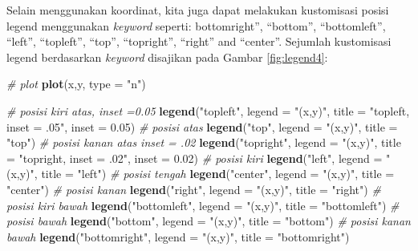 \documentclass[
]{book}
\newenvironment{Shaded}{\begin{snugshade}}{\end{snugshade}}
\newcommand{\AttributeTok}[1]{\textcolor[rgb]{0.13,0.29,0.53}{#1}}
\newcommand{\CommentTok}[1]{\textcolor[rgb]{0.56,0.35,0.01}{\textit{#1}}}
\newcommand{\FloatTok}[1]{\textcolor[rgb]{0.00,0.00,0.81}{#1}}
\newcommand{\FunctionTok}[1]{\textcolor[rgb]{0.13,0.29,0.53}{\textbf{#1}}}
\newcommand{\NormalTok}[1]{#1}
\newcommand{\StringTok}[1]{\textcolor[rgb]{0.31,0.60,0.02}{#1}}
\theoremstyle{definition}
\theoremstyle{definition}
\theoremstyle{definition}
\theoremstyle{definition}
\theoremstyle{remark}
\begin{document}
Selain menggunakan koordinat, kita juga dapat melakukan kustomisasi posisi legend menggunakan \emph{keyword} seperti: bottomright'', ``bottom'', ``bottomleft'', ``left'', ``topleft'', ``top'', ``topright'', ``right'' and ``center''. Sejumlah kustomisasi legend berdasarkan \emph{keyword} disajikan pada Gambar \ref{fig:legend4}:

\begin{Shaded}
\begin{Highlighting}[]
\CommentTok{\# plot}
\FunctionTok{plot}\NormalTok{(x,y, }\AttributeTok{type =} \StringTok{"n"}\NormalTok{)}

\CommentTok{\# posisi kiri atas, inset =0.05}
\FunctionTok{legend}\NormalTok{(}\StringTok{"topleft"}\NormalTok{,}
  \AttributeTok{legend =} \StringTok{"(x,y)"}\NormalTok{,}
  \AttributeTok{title =} \StringTok{"topleft, inset = .05"}\NormalTok{,}
  \AttributeTok{inset =} \FloatTok{0.05}\NormalTok{)}
\CommentTok{\# posisi atas}
\FunctionTok{legend}\NormalTok{(}\StringTok{"top"}\NormalTok{,}
       \AttributeTok{legend =} \StringTok{"(x,y)"}\NormalTok{,}
       \AttributeTok{title =} \StringTok{"top"}\NormalTok{)}
\CommentTok{\# posisi kanan atas inset = .02}
\FunctionTok{legend}\NormalTok{(}\StringTok{"topright"}\NormalTok{,}
       \AttributeTok{legend =} \StringTok{"(x,y)"}\NormalTok{,}
       \AttributeTok{title =} \StringTok{"topright, inset = .02"}\NormalTok{,}
       \AttributeTok{inset =} \FloatTok{0.02}\NormalTok{)}
\CommentTok{\# posisi kiri}
\FunctionTok{legend}\NormalTok{(}\StringTok{"left"}\NormalTok{,}
       \AttributeTok{legend =} \StringTok{"(x,y)"}\NormalTok{,}
       \AttributeTok{title =} \StringTok{"left"}\NormalTok{)}
\CommentTok{\# posisi tengah}
\FunctionTok{legend}\NormalTok{(}\StringTok{"center"}\NormalTok{,}
       \AttributeTok{legend =} \StringTok{"(x,y)"}\NormalTok{,}
       \AttributeTok{title =} \StringTok{"center"}\NormalTok{)}
\CommentTok{\# posisi kanan}
\FunctionTok{legend}\NormalTok{(}\StringTok{"right"}\NormalTok{,}
       \AttributeTok{legend =} \StringTok{"(x,y)"}\NormalTok{,}
       \AttributeTok{title =} \StringTok{"right"}\NormalTok{)}
\CommentTok{\# posisi kiri bawah}
\FunctionTok{legend}\NormalTok{(}\StringTok{"bottomleft"}\NormalTok{,}
       \AttributeTok{legend =} \StringTok{"(x,y)"}\NormalTok{,}
       \AttributeTok{title =} \StringTok{"bottomleft"}\NormalTok{)}
\CommentTok{\# posisi bawah}
\FunctionTok{legend}\NormalTok{(}\StringTok{"bottom"}\NormalTok{,}
       \AttributeTok{legend =} \StringTok{"(x,y)"}\NormalTok{,}
       \AttributeTok{title =} \StringTok{"bottom"}\NormalTok{)}
\CommentTok{\# posisi kanan bawah}
\FunctionTok{legend}\NormalTok{(}\StringTok{"bottomright"}\NormalTok{,}
       \AttributeTok{legend =} \StringTok{"(x,y)"}\NormalTok{,}
       \AttributeTok{title =} \StringTok{"bottomright"}\NormalTok{)}
\end{Highlighting}
\end{Shaded}
\end{document}
